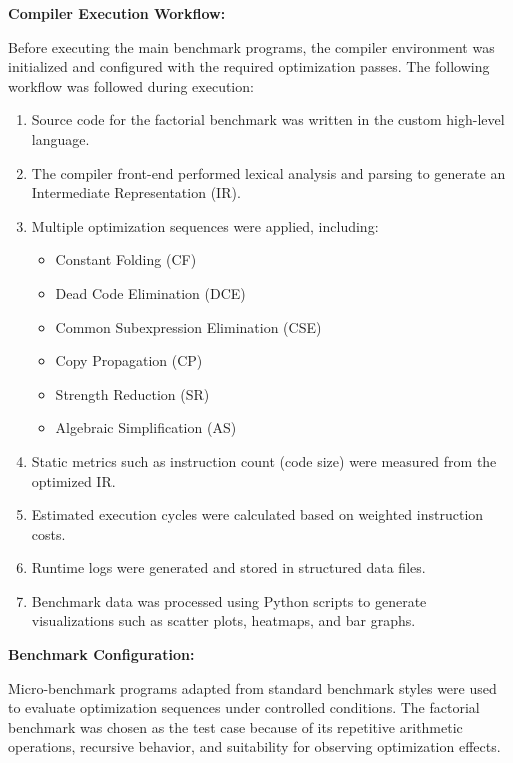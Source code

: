 \documentclass[conference]{IEEEtran}
\begin{document}
\textbf{Compiler Execution Workflow:}

Before executing the main benchmark programs, the compiler environment was initialized and configured with the required optimization passes. The following workflow was followed during execution:

\begin{enumerate}

\item Source code for the factorial benchmark was written in the custom high-level language.

\item The compiler front-end performed lexical analysis and parsing to generate an Intermediate Representation (IR).

\item Multiple optimization sequences were applied, including:
    \begin{itemize}
        \item Constant Folding (CF)
        \item Dead Code Elimination (DCE)
        \item Common Subexpression Elimination (CSE)
        \item Copy Propagation (CP)
        \item Strength Reduction (SR)
        \item Algebraic Simplification (AS)
    \end{itemize}

\item Static metrics such as instruction count (code size) were measured from the optimized IR.

\item Estimated execution cycles were calculated based on weighted instruction costs.

\item Runtime logs were generated and stored in structured data files.

\item Benchmark data was processed using Python scripts to generate visualizations such as scatter plots, heatmaps, and bar graphs.

\end{enumerate}

\textbf{Benchmark Configuration:}

Micro-benchmark programs adapted from standard benchmark styles were used to evaluate optimization sequences under controlled conditions. The factorial benchmark was chosen as the test case because of its repetitive arithmetic operations, recursive behavior, and suitability for observing optimization effects.
\end{document}
